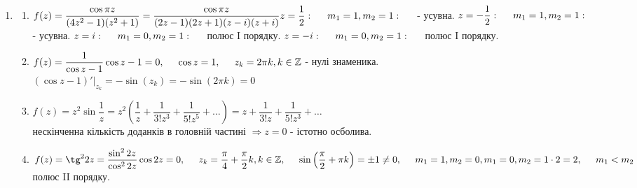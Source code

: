 \documentclass[a4paper,12pt]{article}
\newcommand\tab[1][0.5cm]{\hspace*{#1}}
\begin{document}
\begin{justify}
\begin{enumerate}
 			\item \begin{enumerate}
 				\item $f(z)=\dfrac{\cos\pi z}{(4z^2-1)(z^2+1)}=\dfrac{\cos\pi z}{(2z-1)(2z+1)(z-i)(z+i)}\\
 					z=\dfrac12:\tab m_1=1,m_2=1:\tab $ - усувна.
 					$\\z=-\dfrac12:\tab m_1=1,m_2=1:\tab $ - усувна.
 					$\\z=i:\tab m_1=0,m_2=1:\tab$ полюс I порядку.
 					$\\z=-i:\tab m_1=0,m_2=1:\tab$ полюс I порядку.
 				\item $f(z)=\dfrac{1}{\cos z-1}\\\cos z-1=0,\tab \cos z=1,\tab z_k=2\pi k,k\in\mathbb{Z}$ - нулі знаменика.\\$(\cos z-1)'\big|_{z_k}=-\sin(z_k)=-\sin(2\pi k)=0$
 				\item $f(z)=z^2\sin\dfrac1z=z^2\left(\dfrac1z+\dfrac{1}{3!z^3}+\dfrac{1}{5!z^5}+\dots\right)=z+\dfrac{1}{3!z}+\dfrac{1}{5!z^3}+\dots$\\ нескінченна кількість доданків в головній частині $\Longrightarrow z=0$ - істотно осболива.
 				\item $f(z)=\tg^22z=\dfrac{\sin^22z}{\cos^22z}\\\cos2z=0,\tab z_k=\dfrac\pi4+\dfrac\pi2k,k\in\mathbb{Z},\tab \sin\left(\dfrac\pi2+\pi k\right)=\pm1\neq0,\tab m_1=1,m_2=0,\\ m_1=0,m_2=1\cdot2=2,\tab m_1<m_2$ полюс II порядку.
 			\end{enumerate}
 		\end{enumerate}
 		
 	\end{justify}
\end{document}
